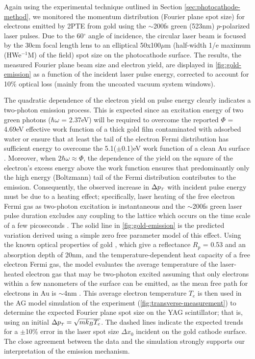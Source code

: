 Again using the experimental technique outlined in Section \ref{sec:photocathode-method}, we monitored the momentum distribution (Fourier plane spot size) for electrons emitted by 2PTE from gold using the $\sim$200fs green (523nm) $p$-polarized laser pulses.
Due to the 60$^{\circ}$ angle of incidence, the circular laser beam is focused by the 30cm focal length lens to an elliptical 50x100$\mu$m (half-width 1/e maximum (HWe$^{-1}$M) of the field) spot size on the photocathode surface.
The results, the measured Fourier plane beam size and electron yield, are displayed in \ref{fig:gold-emission} as a function of the incident laser pulse energy, corrected to account for 10\% optical loss (mainly from the uncoated vacuum system windows).

The quadratic dependence of the electron yield on pulse energy clearly indicates a two-photon emission process.
This is expected since an excitation energy of two green photons ($\hbar \omega$ = 2.37eV) will be required to overcome the reported $\Phi$ = 4.69eV effective work function of a thick gold film contaminated with adsorbed water \cite{monjushiro_ultraviolet_1991} or ensure that at least the tail of the electron Fermi distribution has sufficient energy to overcome the 5.1($\pm$0.1)eV work function of a clean Au surface \cite{eastman_photoelectric_1970}.
Moreover, when $2\hbar \omega \approx \Phi$, the dependence of the yield on the square of the electron's excess energy above the work function \cite{monjushiro_ultraviolet_1991} ensures that predominantly only the high energy (Boltzmann) tail of the Fermi distribution contributes to the emission.
Consequently, the observed increase in $\Delta p_{{\scriptscriptstyle T}}$ with incident pulse energy must be due to a heating effect; specifically, laser heating of the free electron Fermi gas as two-photon excitation is instantaneous and the $\sim$200fs green laser pulse duration excludes any coupling to the lattice which occurs on the time scale of a few picoseconds \cite{chen_semiclassical_2006}.
The solid line in \ref{fig:gold-emission} is the predicted variation derived using a simple zero free parameter model of this effect.
Using the known optical properties of gold \cite{johnson_optical_1972}, which give a reflectance $R_p$ = 0.53 and an absorption depth of 20nm, and the temperature-dependent heat capacity of a free electron Fermi gas, the model evaluates the average temperature of the laser-heated electron gas that may be two-photon excited assuming that only electrons within a few nanometers of the surface can be emitted, as the mean free path for electrons in Au is $\sim$4nm \cite{seah_quantitative_1979}.
This average electron temperature $T_e$ is then used in the AG model simulation of the experiment (\ref{fig:transverse-measurement}) to determine the expected Fourier plane spot size on the YAG scintillator; that is, using an initial $\Delta p_{{\scriptscriptstyle T}} = \sqrt{m k_B T_e}$.  The dashed lines indicate the expected trends for a $\pm$10\% error in the laser spot size $\Delta x_0$ incident on the gold cathode surface.
The close agreement between the data and the simulation strongly supports our interpretation of the emission mechanism.
